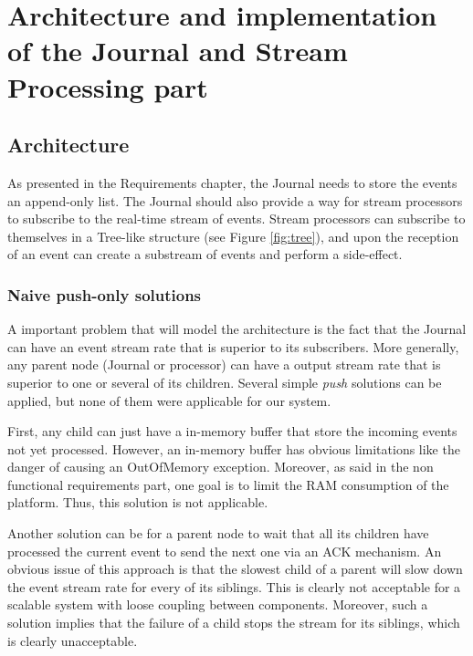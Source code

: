 \chapter{Architecture and implementation of the Journal and Stream Processing part}

\section{Architecture}

As presented in the Requirements chapter, the Journal needs to store the events an append-only list. The Journal should also provide a way for stream processors to subscribe 
to the real-time stream of events. Stream processors can subscribe to themselves in a Tree-like structure (see Figure \ref{fig:tree}), and upon the reception of an event can create a substream of events and perform a side-effect.
\\

\subsection{Naive push-only solutions}

A important problem that will model the architecture is the fact that the Journal can have an event stream rate that is superior to its subscribers. More generally,
any parent node (Journal or processor) can have a output stream rate that is superior to one or several of its children. 
Several simple \textit{push} solutions can be applied, but none of them were applicable for our system.

First, any child can just have a in-memory buffer that store the incoming events not yet processed. However, an in-memory buffer has obvious limitations like the danger
of causing an OutOfMemory exception. Moreover, as said in the non functional requirements part, one goal is to limit the RAM consumption of the platform. Thus, this solution is
not applicable.

Another solution can be for a parent node to wait that all its children have processed the current event to send the next one via an ACK mechanism. 
An obvious issue of this approach is that
the slowest child of a parent will slow down the event stream rate for every of its siblings. This is clearly not acceptable for a scalable system with loose coupling 
between components. Moreover, such a solution implies that the failure of a child stops the stream for its siblings, which is clearly unacceptable.

